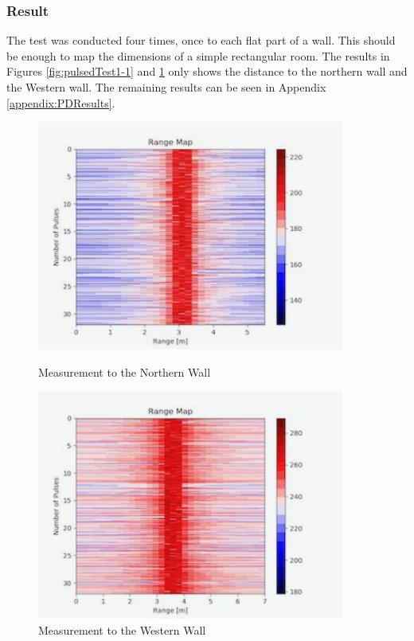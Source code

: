 \subsubsection{Result}
The test was conducted four times, once to each flat part of a wall. This should be enough to map the dimensions of a simple rectangular room. The results in Figures \ref{fig:pulsedTest1-1} and \ref{fig:pulsedTest1-2} only shows the distance to the northern wall and the Western wall. The remaining results can be seen in Appendix \ref{appendix:PDResults}.

\begin{figure}[h!]
    \centering
    \begin{minipage}{0.45\textwidth}
        \centering
        \includegraphics[width = 0.9\textwidth]{images/pulsedTest1-1.pdf}
        \caption{Measurement to the Northern Wall}\label{fig:pulsedTest1-1}
    \end{minipage}\hfill
    \begin{minipage}{0.45\textwidth}
        \centering
        \includegraphics[width=0.9\textwidth]{images/pulsedTest1-2.pdf}
        \caption{Measurement to the Western Wall}\label{fig:pulsedTest1-2}
    \end{minipage}
\end{figure}


